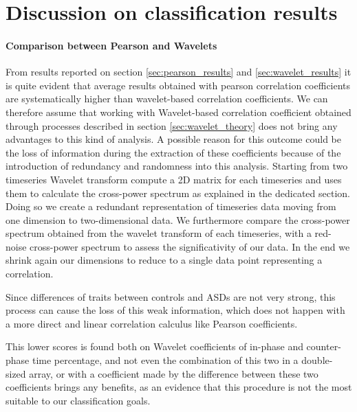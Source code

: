 \documentclass[10pt]{report}
\begin{document}
\section{Discussion on classification results}

\paragraph{Comparison between Pearson and Wavelets}
From results reported on section \ref{sec:pearson_results} and \ref{sec:wavelet_results} it is quite evident that average results obtained with pearson correlation coefficients are systematically higher than wavelet-based correlation coefficients.
We can therefore assume that working with Wavelet-based correlation coefficient obtained through processes described in section \ref{sec:wavelet_theory} does not bring any advantages to this kind of analysis.
A possible reason for this outcome could be the loss of information during the extraction of these coefficients because of the introduction of redundancy and randomness into this analysis. Starting from two timeseries Wavelet transform compute a 2D matrix for each timeseries and uses them to calculate the cross-power spectrum as explained in the dedicated section.
Doing so we create a redundant representation of timeseries data moving from one dimension to two-dimensional data.
We furthermore compare the cross-power spectrum obtained from the wavelet transform of each timeseries, with a red-noise cross-power spectrum to assess the significativity of our data.
In the end we shrink again our dimensions to reduce to a single data point representing a correlation.

Since differences of traits between controls and ASDs are not very strong, this process can cause the loss of this weak information, which does not happen with a more direct and linear correlation calculus like Pearson coefficients.

This lower scores is found both on Wavelet coefficients of in-phase and counter-phase time percentage, and not even the combination of this two in a double-sized array, or with a coefficient made by the difference between these two coefficients brings any benefits, as an evidence that this procedure is not the most suitable to our classification goals.
\end{document}
